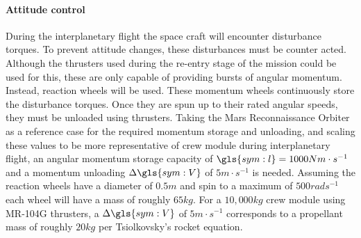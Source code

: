 \paragraph{Attitude control}
During the interplanetary flight the space craft will encounter disturbance torques. To prevent attitude changes, these disturbances must be counter acted. Although the thrusters used during the re-entry stage of the mission could be used for this, these are only capable of providing bursts of angular momentum. Instead, reaction wheels will be used. These momentum wheels continuously store the disturbance torques. Once they are spun up to their rated angular speeds, they must be unloaded using thrusters. Taking the Mars Reconnaissance Orbiter \cite{You2007} as a reference case for the required momentum storage and unloading, and scaling these values to be more representative of crew module during interplanetary flight, an angular momentum storage capacity of $\gls{sym:l} = 1000 Nm\cdot s^{-1} $ and a momentum unloading $\Delta\gls{sym:V}$ of $5 m\cdot s^{-1}$ is needed. Assuming the reaction wheels have a diameter of $0.5 m$ and spin to a maximum of $500 rads^{-1}$ each wheel will have a mass of roughly $65 kg$. For a $10,000kg$ crew module using MR-104G thrusters, a $\Delta\gls{sym:V}$ of $5 m\cdot s^{-1}$ corresponds to a propellant mass of roughly $20kg$ per Tsiolkovsky's rocket equation. 

